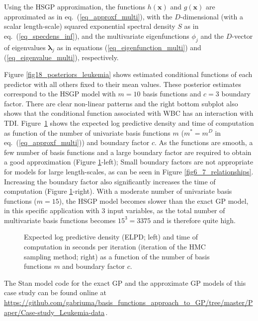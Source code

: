 Using the HSGP approximation, the functions $h(\bm{x})$ and $g(\bm{x})$ are approximated as in eq.~(\ref{eq_approxf_multi}), with the $D$-dimensional (with a scalar length-scale) squared exponential spectral density $S$ as in eq.~(\ref{eq_specdens_inf}), and the multivariate eigenfunctions $\phi_j$ and the $D$-vector of eigenvalues $\bm{\lambda}_j$ as in equations (\ref{eq_eigenfunction_multi}) and  (\ref{eq_eigenvalue_multi}), respectively.

Figure \ref{fig18_posteriors_leukemia} shows estimated conditional functions of each predictor with all others fixed to their mean values. These posterior estimates correspond to the HSGP model with $m=10$ basis functions and $c=3$ boundary factor. There are clear  non-linear patterns and the right bottom subplot also shows that the conditional function associated with WBC has an interaction with TDI.
Figure~\ref{fig19_elpd_leukemia} shows the expected log predictive density \citep[ELPD; ][]{vehtari_2012,Vehtari+Gelman+Gabry:2017_practical} and time of computation as function of the number of univariate basis functions $m$ ($m^{\ast}=m^D$ in eq.~(\ref{eq_approxf_multi})) and boundary factor $c$. As the functions are smooth, a few number of basis functions and a large boundary factor are required to obtain a good approximation (Figure \ref{fig19_elpd_leukemia}-left); Small boundary factors are not appropriate for models for large length-scales, as can be seen in Figure \ref{fig6_7_relationships}. Increasing the boundary factor also significantly increases the time of computation (Figure \ref{fig19_elpd_leukemia}-right). With a moderate number of univariate basis functions ($m=15$), the HSGP model becomes slower than the exact GP model, in this specific application with $3$ input variables, as the total number of multivariate basis functions becomes $15^3 = 3375$ and is therefore quite high. 
%
\begin{figure}
\centering
{} 
\caption{Expected log predictive density (ELPD; left) and time of computation in seconds per iteration (iteration of the HMC sampling method; right) as a function of the number of basis functions $m$ and boundary factor $c$.}
  \label{fig19_elpd_leukemia}
\end{figure}

The Stan model code for the exact GP and the approximate GP models of this case study can be found online at {\small \url{https://github.com/gabriuma/basis_functions_approach_to_GP/tree/master/Paper/Case-study_Leukemia-data}}\,.
%

